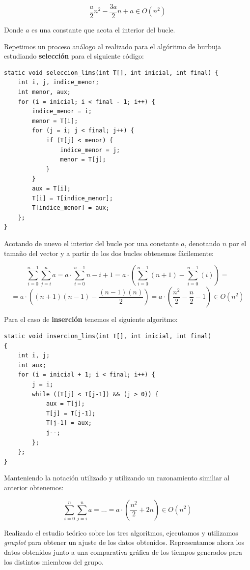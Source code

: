 \documentclass[11pt,a4paper]{article}
\begin{document}
$$\frac{a}{2} n^2 - \frac{3a}{2} n + a \in O(n^2)$$

Donde $a$ es una constante que acota el interior del bucle.

Repetimos un proceso análogo al realizado para el algóritmo de burbuja estudiando \textbf{selección} para el siguiente código:

\newpage

\begin{lstlisting}
static void seleccion_lims(int T[], int inicial, int final) {
	int i, j, indice_menor;
	int menor, aux;
	for (i = inicial; i < final - 1; i++) {
		indice_menor = i;
		menor = T[i];
		for (j = i; j < final; j++) {
			if (T[j] < menor) {
				indice_menor = j;
				menor = T[j];
			}
		}
		aux = T[i];
		T[i] = T[indice_menor];
		T[indice_menor] = aux;
	};
}
\end{lstlisting}

Acotando de nuevo el interior del bucle por una constante $a$, denotando $n$ por el tamaño del vector y a partir de los dos bucles obtenemos fácilemente:

$$\sum_{i=0}^{n-1} \sum_{j=i}^{n} a = a \cdot \sum_{i=0}^{n-1} n - i + 1 = a \cdot ( \sum_{i=0}^{n-1} (n + 1) - \sum_{i=0}^{n-1}(i) ) =  $$
$$ = a \cdot ((n+1)(n-1) - \frac{(n-1)(n)}{2}) = a \cdot (\frac{n^2}{2} - \frac{n}{2} - 1) \in O(n^2)$$

Para el caso de \textbf{inserción} tenemos el siguiente algoritmo:

\begin{lstlisting}
static void insercion_lims(int T[], int inicial, int final)
{
	int i, j;
	int aux;
	for (i = inicial + 1; i < final; i++) {
		j = i;
		while ((T[j] < T[j-1]) && (j > 0)) {
			aux = T[j];
			T[j] = T[j-1];
			T[j-1] = aux;
			j--;
		};
	};
}
\end{lstlisting}

Manteniendo la notación utilizado y utilizando un razonamiento similiar al anterior obtenemos:

$$\sum_{i=0}^{n} \sum_{j=i}^{n} a = ... = a \cdot (\frac{n^2}{2} + 2n) \in O(n^2)$$

Realizado el estudio teórico sobre los tres algoritmos, ejecutamos y utilizamos \emph{gnuplot} para obtener un ajuste de los datos obtenidos. Representamos ahora los datos obtenidos junto a una comparativa gráfica de los tiempos generados para los distintos miembros del grupo. 
\end{document}
